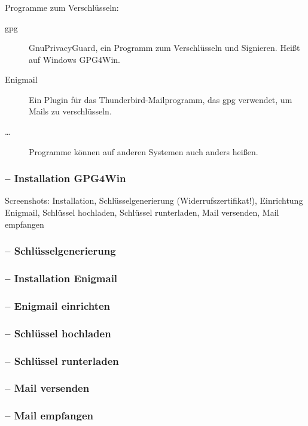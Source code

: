 \documentclass[compress]{beamer}
\begin{document}
\begin{frame}
  \frametitle{\insertsection}
  Programme zum Verschlüsseln:

  \begin{description}
  \item[gpg] \alert{G}nu\alert{P}rivacy\alert{G}uard, ein Programm zum
    Verschlüsseln und Signieren.  Heißt auf Windows \alert{GPG4Win}.
  \item[Enigmail] Ein Plugin für das Thunderbird-Mailprogramm, das gpg
    verwendet, um Mails zu verschlüsseln.
  \item[\ldots] Programme können auf anderen Systemen auch anders
    heißen.
  \end{description}

\end{frame}

\begin{frame}
  \frametitle{\insertsection{} -- Installation GPG4Win}
  Screenshots: Installation, Schlüsselgenerierung
  (Widerrufszertifikat!), Einrichtung Enigmail, Schlüssel hochladen,
  Schlüssel runterladen, Mail versenden, Mail empfangen
\end{frame}

\begin{frame}
  \frametitle{\insertsection{} -- Schlüsselgenerierung}
\end{frame}

\begin{frame}
  \frametitle{\insertsection{} -- Installation Enigmail}
\end{frame}

\begin{frame}
  \frametitle{\insertsection{} -- Enigmail einrichten}
\end{frame}

\begin{frame}
  \frametitle{\insertsection{} -- Schlüssel hochladen}
\end{frame}

\begin{frame}
  \frametitle{\insertsection{} -- Schlüssel runterladen}
\end{frame}

\begin{frame}
  \frametitle{\insertsection{} -- Mail versenden}
\end{frame}

\begin{frame}
  \frametitle{\insertsection{} -- Mail empfangen}
\end{frame}
\end{document}
